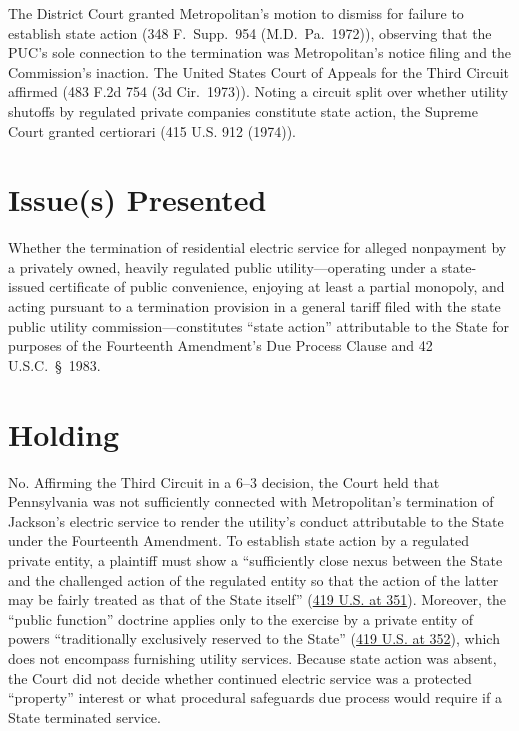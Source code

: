 \documentclass[12pt]{article}
\begin{document}
The District Court granted Metropolitan's motion to dismiss for failure to establish state action (348 F.\ Supp.\ 954 (M.D.\ Pa.\ 1972)), observing that the PUC's sole connection to the termination was Metropolitan's notice filing and the Commission's inaction. The United States Court of Appeals for the Third Circuit affirmed (483 F.2d 754 (3d Cir.\ 1973)). Noting a circuit split over whether utility shutoffs by regulated private companies constitute state action, the Supreme Court granted certiorari (415 U.S. 912 (1974)).

\section{Issue(s) Presented}

Whether the termination of residential electric service for alleged nonpayment by a privately owned, heavily regulated public utility---operating under a state-issued certificate of public convenience, enjoying at least a partial monopoly, and acting pursuant to a termination provision in a general tariff filed with the state public utility commission---constitutes ``state action'' attributable to the State for purposes of the Fourteenth Amendment's Due Process Clause and 42 U.S.C.\ \S~1983.

\section{Holding}

No. Affirming the Third Circuit in a 6--3 decision, the Court held that Pennsylvania was not sufficiently connected with Metropolitan's termination of Jackson's electric service to render the utility's conduct attributable to the State under the Fourteenth Amendment. To establish state action by a regulated private entity, a plaintiff must show a ``sufficiently close nexus between the State and the challenged action of the regulated entity so that the action of the latter may be fairly treated as that of the State itself'' (\href{https://supreme.justia.com/cases/federal/us/419/345/}{419 U.S. at 351}). Moreover, the ``public function'' doctrine applies only to the exercise by a private entity of powers ``traditionally exclusively reserved to the State'' (\href{https://supreme.justia.com/cases/federal/us/419/345/}{419 U.S. at 352}), which does not encompass furnishing utility services. Because state action was absent, the Court did not decide whether continued electric service was a protected ``property'' interest or what procedural safeguards due process would require if a State terminated service.
\end{document}
